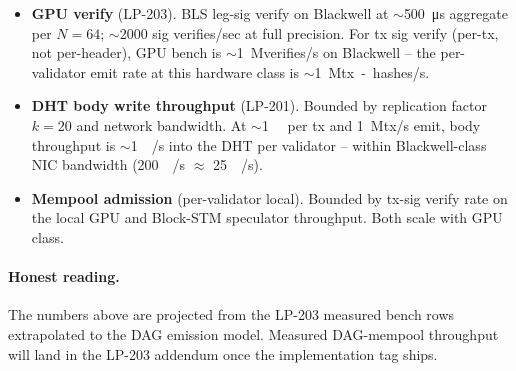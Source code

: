 \begin{itemize}[leftmargin=2em,nosep]
\item \textbf{GPU verify} (LP-203). BLS leg-sig verify on Blackwell
  at $\sim$\SI{500}{\micro\second} aggregate per $N{=}64$; $\sim 2000$
  sig verifies/sec at full precision. For tx sig verify (per-tx, not
  per-header), GPU bench is $\sim$\SI{1}{\mega verifies/s} on
  Blackwell -- the per-validator emit rate at this hardware class is
  $\sim$\SI{1}{\mega tx-hashes/s}.
\item \textbf{DHT body write throughput} (LP-201). Bounded by
  replication factor $k{=}20$ and network bandwidth. At
  $\sim$\SI{1}{\kilo\byte} per tx and \SI{1}{\mega tx/s} emit, body
  throughput is $\sim$\SI{1}{\gibi\byte/\second} into the DHT per
  validator -- within Blackwell-class NIC bandwidth
  (\SI{200}{\giga\bit/\second} $\approx$
  \SI{25}{\gibi\byte/\second}).
\item \textbf{Mempool admission} (per-validator local). Bounded by
  tx-sig verify rate on the local GPU and Block-STM speculator
  throughput. Both scale with GPU class.
\end{itemize}

\paragraph{Honest reading.} The numbers above are projected from the
LP-203 measured bench rows extrapolated to the DAG emission model.
Measured DAG-mempool throughput will land in the LP-203 addendum
once the implementation tag ships.
